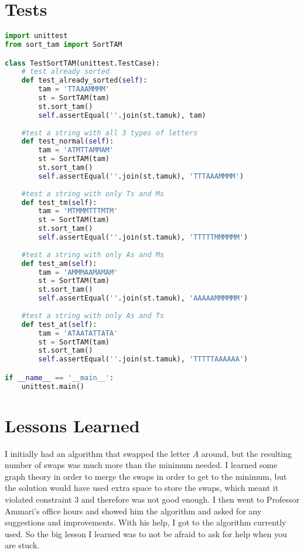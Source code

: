 \documentclass[12pt]{report}
\begin{document}
\chapter{Tests}
\begin{lstlisting}[language=Python, caption=sort\_tam\_tests.py]
import unittest
from sort_tam import SortTAM

class TestSortTAM(unittest.TestCase):
    # test already sorted
    def test_already_sorted(self):
        tam = 'TTAAAMMMM'
        st = SortTAM(tam)
        st.sort_tam()
        self.assertEqual(''.join(st.tamuk), tam)
    
    #test a string with all 3 types of letters
    def test_normal(self):
        tam = 'ATMTTAMMAM'
        st = SortTAM(tam)
        st.sort_tam()
        self.assertEqual(''.join(st.tamuk), 'TTTAAAMMMM')
    
    #test a string with only Ts and Ms
    def test_tm(self):
        tam = 'MTMMMTTTMTM'
        st = SortTAM(tam)
        st.sort_tam()
        self.assertEqual(''.join(st.tamuk), 'TTTTTMMMMMM')
    
    #test a string with only As and Ms
    def test_am(self):
        tam = 'AMMMAAMAMAM'
        st = SortTAM(tam)
        st.sort_tam()
        self.assertEqual(''.join(st.tamuk), 'AAAAAMMMMMM')
    
    #test a string with only As and Ts
    def test_at(self):
        tam = 'ATAATATTATA'
        st = SortTAM(tam)
        st.sort_tam()
        self.assertEqual(''.join(st.tamuk), 'TTTTTAAAAAA')

if __name__ == '__main__':
    unittest.main()
\end{lstlisting}

\chapter{Lessons Learned}
I initially had an algorithm that swapped the letter $A$ around, but the resulting number of swaps was much more than the minimum needed. 
I learned some graph theory in order to merge the swaps in order to get to the minimum, 
but the solution would have used extra space to store the swaps, which meant it violated constraint 3 and therefore was not good enough.
I then went to Professor Ammari's office hours and showed him the algorithm and asked for any suggestions and improvements.
With his help, I got to the algorithm currently used. So the big lesson I learned was to not be afraid to ask for help when you are stuck.



 
\end{document}
